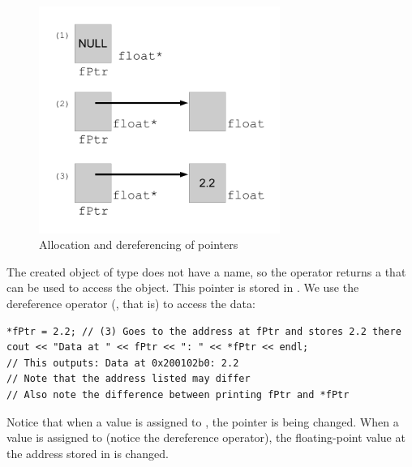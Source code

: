 \begin{figure}[tbh]
  \centering
  \includegraphics[width=0.7\textwidth]{diagrams/new_operator_diagram_1.pdf}
  \caption{Allocation and dereferencing of pointers} \label{fig:new_operator_diagram_1} 
\end{figure}

The created object of type  does not have a name, so the  operator returns a  that can be used to access the object. 
This pointer is stored in . 
We use the dereference operator (\Code{*}, that is) to access the data:

\noindent\begin{minipage}{\linewidth}\begin{lstlisting}
*fPtr = 2.2; // (3) Goes to the address at fPtr and stores 2.2 there
cout << "Data at " << fPtr << ": " << *fPtr << endl;
// This outputs: Data at 0x200102b0: 2.2
// Note that the address listed may differ
// Also note the difference between printing fPtr and *fPtr
\end{lstlisting}\end{minipage}

Notice that when a value is assigned to , the pointer is being changed. 
When a value is assigned to  (notice the dereference operator), the floating-point value at the address stored in  is changed. 

